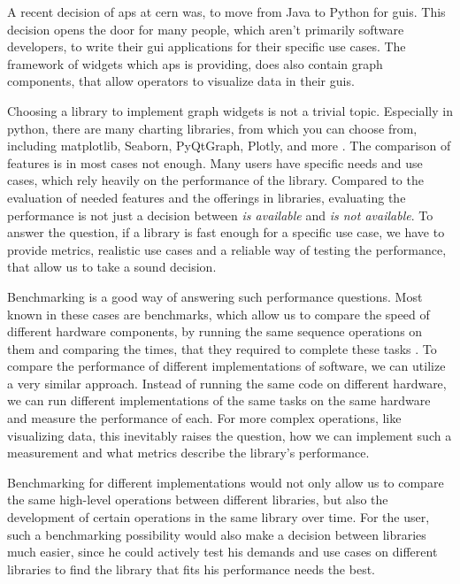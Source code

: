 A recent decision of \gls{aps} at \gls{cern} was, to move from Java to Python
for \glspl{gui}. This decision opens the door for many people, which aren't
primarily software developers, to write their \gls{gui} applications for
their specific use cases. The framework of widgets which \gls{aps} is providing,
does also contain graph components, that allow operators to visualize data in
their \glspl{gui}.

Choosing a library to implement graph widgets is not a trivial topic. Especially
in python, there are many charting libraries, from which you can choose from,
including matplotlib, Seaborn, PyQtGraph, Plotly, and more \cite{PyDataVisLibs}.
The comparison of features is in most cases not enough. Many users have
specific needs and use cases, which rely heavily on the performance of the
library. Compared to the evaluation of needed features and the offerings in
libraries, evaluating the performance is not just a decision between \emph{is
available} and \emph{is not available}. To answer the question, if a library is
fast enough for a specific use case, we have to provide metrics, realistic use
cases and a reliable way of testing the performance, that allow us to take a
sound decision.

Benchmarking is a good way of answering such performance questions. Most known
in these cases are benchmarks, which allow us to compare the speed of different
hardware components, by running the same sequence operations on them and
comparing the times, that they required to complete these tasks
\cite{OverviewBenchmarks}. To compare the performance of different
implementations of software, we can utilize a very similar approach. Instead of
running the same code on different hardware, we can run different
implementations of the same tasks on the same hardware and measure the
performance of each. For more complex operations, like visualizing data, this inevitably
raises the question, how we can implement such a measurement and what metrics
describe the library's performance.

Benchmarking for different implementations would not only allow us to compare
the same high-level operations between different libraries, but also the
development of certain operations in the same library over time. For the user,
such a benchmarking possibility would also make a decision between libraries
much easier, since he could actively test his demands and use cases on different
libraries to find the library that fits his performance needs the best.




